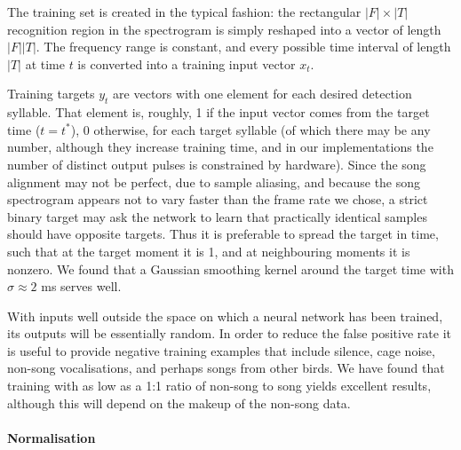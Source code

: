 \documentclass[10pt,letterpaper]{article}
\renewcommand{\subsubsection}[1]{\paragraph{#1}}
\begin{document}
The training set is created in the typical fashion:
the rectangular $|F|\times |T|$ recognition region in the spectrogram is
simply reshaped into a vector of length $|F||T|$. The frequency range is constant, and every possible time interval of length $|T|$ at time $t$ is converted into a training input vector $x_t$.

Training targets $y_t$ are vectors with one element for each desired detection syllable.  That element is, roughly, 1 if the input vector comes from the
target time ($t=t^*$), 0 otherwise, for each target syllable (of which there may be any number, although they increase training time, and in our implementations the number of distinct output pulses is constrained by hardware).  Since the song
alignment may not be perfect, due to sample aliasing, and because the song spectrogram appears not to vary faster than the frame rate we chose, a strict binary target may ask the network to learn that practically identical samples should have opposite targets. Thus it is preferable to spread the target
in time, such that at the target moment it is 1,
and at neighbouring moments it is nonzero. We found that a Gaussian
smoothing kernel around the target time with $\sigma\approx 2$ ms serves well.

With inputs well outside the space on which a neural network has been
trained, its outputs will be essentially random. In order to reduce
the false positive rate it is useful to provide negative training
examples that include silence, cage noise, non-song vocalisations, and
perhaps songs from other birds.  We have found that training with
as low as a 1:1 ratio of non-song to song yields excellent results,
although this will depend on the makeup of the non-song data.

\subsubsection{Normalisation}
\end{document}

